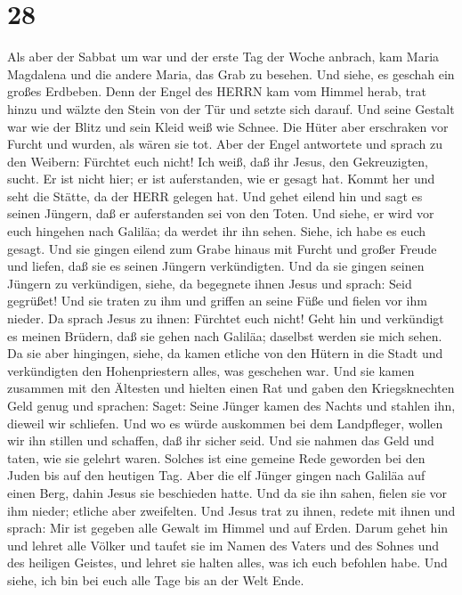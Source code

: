\hypertarget{section-27}{%
\section{28}\label{section-27}}

 Als aber der Sabbat um war und der erste Tag der Woche
anbrach, kam Maria Magdalena und die andere Maria, das Grab zu besehen.
 Und siehe, es geschah ein großes Erdbeben. Denn der Engel
des HERRN kam vom Himmel herab, trat hinzu und wälzte den Stein von der
Tür und setzte sich darauf.  Und seine Gestalt war wie der
Blitz und sein Kleid weiß wie Schnee.  Die Hüter aber
erschraken vor Furcht und wurden, als wären sie tot.  Aber
der Engel antwortete und sprach zu den Weibern: Fürchtet euch nicht! Ich
weiß, daß ihr Jesus, den Gekreuzigten, sucht.  Er ist nicht
hier; er ist auferstanden, wie er gesagt hat. Kommt her und seht die
Stätte, da der HERR gelegen hat.  Und gehet eilend hin und
sagt es seinen Jüngern, daß er auferstanden sei von den Toten. Und
siehe, er wird vor euch hingehen nach Galiläa; da werdet ihr ihn sehen.
Siehe, ich habe es euch gesagt.  Und sie gingen eilend zum
Grabe hinaus mit Furcht und großer Freude und liefen, daß sie es seinen
Jüngern verkündigten. Und da sie gingen seinen Jüngern zu verkündigen,
 siehe, da begegnete ihnen Jesus und sprach: Seid gegrüßet!
Und sie traten zu ihm und griffen an seine Füße und fielen vor ihm
nieder.  Da sprach Jesus zu ihnen: Fürchtet euch nicht!
Geht hin und verkündigt es meinen Brüdern, daß sie gehen nach Galiläa;
daselbst werden sie mich sehen.  Da sie aber hingingen,
siehe, da kamen etliche von den Hütern in die Stadt und verkündigten den
Hohenpriestern alles, was geschehen war.  Und sie kamen
zusammen mit den Ältesten und hielten einen Rat und gaben den
Kriegsknechten Geld genug  und sprachen: Saget: Seine
Jünger kamen des Nachts und stahlen ihn, dieweil wir schliefen.
 Und wo es würde auskommen bei dem Landpfleger, wollen wir
ihn stillen und schaffen, daß ihr sicher seid.  Und sie
nahmen das Geld und taten, wie sie gelehrt waren. Solches ist eine
gemeine Rede geworden bei den Juden bis auf den heutigen Tag.
 Aber die elf Jünger gingen nach Galiläa auf einen Berg,
dahin Jesus sie beschieden hatte.  Und da sie ihn sahen,
fielen sie vor ihm nieder; etliche aber zweifelten.  Und
Jesus trat zu ihnen, redete mit ihnen und sprach: Mir ist gegeben alle
Gewalt im Himmel und auf Erden.  Darum gehet hin und lehret
alle Völker und taufet sie im Namen des Vaters und des Sohnes und des
heiligen Geistes,  und lehret sie halten alles, was ich
euch befohlen habe. Und siehe, ich bin bei euch alle Tage bis an der
Welt Ende.
